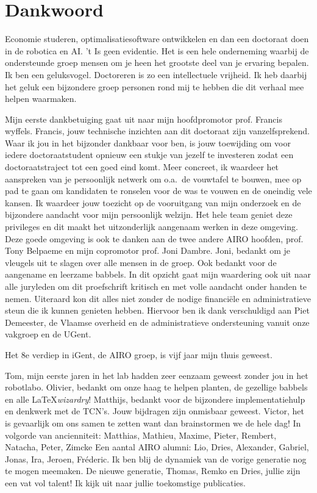 \documentclass[\home/main.tex]{subfiles}
\begin{document}
	
\chapter{Dankwoord}

Economie studeren, optimalisatiesoftware ontwikkelen en dan een doctoraat doen in de robotica en AI. 't Is geen evidentie. Het is een hele onderneming waarbij de ondersteunde groep mensen om je heen het grootste deel van je ervaring bepalen. 
Ik ben een geluksvogel. Doctoreren is zo een intellectuele vrijheid. Ik heb daarbij het geluk een bijzondere groep personen rond mij te hebben die dit verhaal mee helpen waarmaken. 

Mijn eerste dankbetuiging gaat uit naar mijn hoofdpromotor prof. Francis wyffels. Francis, jouw technische inzichten aan dit doctoraat zijn vanzelfsprekend. Waar ik jou in het bijzonder dankbaar voor ben, is jouw toewijding om voor iedere doctoraatstudent opnieuw een stukje van jezelf te investeren zodat een doctoraatstraject tot een goed eind komt. Meer concreet, ik waardeer het aanspreken van je persoonlijk netwerk om o.a.\ de vouwtafel te bouwen, mee op pad te gaan om kandidaten te ronselen voor de was te vouwen en de oneindig vele kansen. Ik waardeer jouw toezicht op de vooruitgang van mijn onderzoek en de bijzondere aandacht voor mijn persoonlijk welzijn. Het hele team geniet deze privileges en dit maakt het uitzonderlijk aangenaam werken in deze omgeving. Deze goede omgeving is ook te danken aan de twee andere AIRO hoofden, prof. Tony Belpaeme en mijn copromotor prof. Joni Dambre. Joni, bedankt om je vleugels uit te slagen over alle mensen in de groep. Ook bedankt voor de aangename en leerzame babbels. In dit opzicht gaat mijn waardering ook uit naar alle juryleden om dit proefschrift kritisch en met volle aandacht onder handen te nemen.
Uiteraard kon dit alles niet zonder de nodige financiële en administratieve steun die ik kunnen genieten hebben. Hiervoor ben ik dank verschuldigd aan Piet Demeester, de Vlaamse overheid en de administratieve ondersteuning vanuit onze vakgroep en de UGent.

Het 8e verdiep in iGent, de AIRO groep, is vijf jaar mijn thuis geweest. 

Tom, mijn eerste jaren in het lab hadden zeer eenzaam geweest zonder jou in het robotlabo. Olivier, bedankt om onze haag te helpen planten, de gezellige babbels en alle \LaTeX \textit{wizardry}!  
Matthijs, bedankt voor de bijzondere implementatiehulp en denkwerk met de TCN's. Jouw bijdragen zijn onmisbaar geweest. Victor, het is gevaarlijk om ons samen te zetten want dan brainstormen we de hele dag! 
In volgorde van ancienniteit: Matthias, Mathieu, Maxime, Pieter, Rembert, Natacha, Peter, Zimcke 
Een aantal AIRO alumni: Lio, Dries, Alexander, Gabriel, Jonas, Ira, Jeroen, Fréderic. Ik ben blij de dynamiek van de vorige generatie nog te mogen meemaken. 
De nieuwe generatie, Thomas, Remko en Dries, jullie zijn een vat vol talent! Ik kijk uit naar jullie toekomstige publicaties. 
\end{document}
